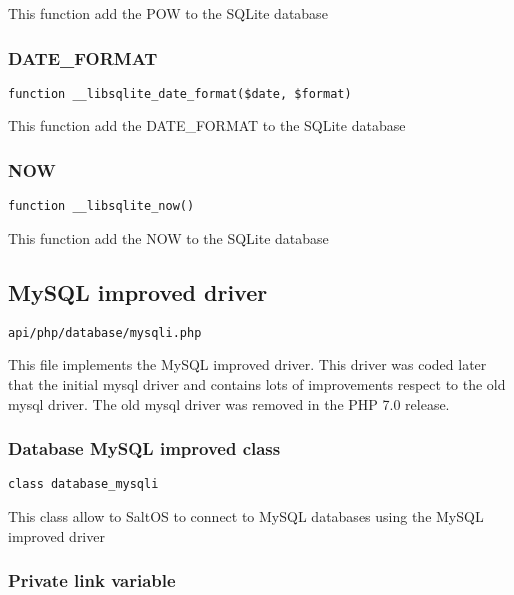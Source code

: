 \documentclass[a4paper]{article}
\begin{document}
This function add the POW to the SQLite database

\hypertarget{toc316}{}
\subsubsection{DATE\_FORMAT}

\begin{lstlisting}
function __libsqlite_date_format($date, $format)
\end{lstlisting}

This function add the DATE\_FORMAT to the SQLite database

\hypertarget{toc317}{}
\subsubsection{NOW}

\begin{lstlisting}
function __libsqlite_now()
\end{lstlisting}

This function add the NOW to the SQLite database

\hypertarget{toc318}{}
\subsection{MySQL improved driver}

\begin{lstlisting}
api/php/database/mysqli.php
\end{lstlisting}

This file implements the MySQL improved driver. This driver was coded later that the initial
mysql driver and contains lots of improvements respect to the old mysql driver. The old mysql
driver was removed in the PHP 7.0 release.

\hypertarget{toc319}{}
\subsubsection{Database MySQL improved class}

\begin{lstlisting}
class database_mysqli
\end{lstlisting}

This class allow to SaltOS to connect to MySQL databases using the MySQL improved driver

\hypertarget{toc320}{}
\subsubsection{Private link variable}
\end{document}
